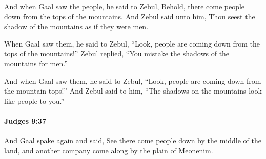 			\begin{versebox}
					\item[BHS] 
					\item[ASV] And when Gaal saw the people, he said to Zebul, Behold, there come people down from the tops of the mountains. And Zebul said unto him, Thou seest the shadow of the mountains as if they were men.
					\item[NIV] When Gaal saw them, he said to Zebul, “Look, people are coming down from the tops of the mountains!” Zebul replied, “You mistake the shadows of the mountains for men.”
					\item[NRSV] And when Gaal saw them, he said to Zebul, “Look, people are coming down from the mountain tops!” And Zebul said to him, “The shadows on the mountains look like people to you.”
			\end{versebox}

		\paragraph{Judges 9:37} %
			\label{JUDGES-9-37}

			And Gaal spake again and said, See there come people down by the middle of the land, and another company come along by the plain of Meonenim.


